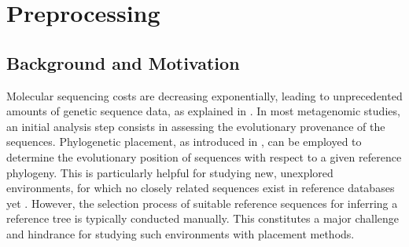 

\chapter{Preprocessing}
\label{ch:AutomaticTrees}






\section{Background and Motivation}
\label{ch:AutomaticTrees:sec:Motivation}

Molecular sequencing costs are decreasing exponentially, leading to unprecedented amounts of genetic sequence data,
as explained in .
In most metagenomic studies, an initial analysis step consists in assessing the evolutionary provenance of the sequences.
Phylogenetic placement, as introduced in ,
can be employed to determine the evolutionary position of sequences with respect to a given reference phylogeny.
This is particularly helpful for studying new, unexplored environments,
for which no closely related sequences exist in reference databases yet \cite{Mahe2017}.
However, the selection process of suitable reference sequences
for inferring a reference tree is typically conducted manually.
This constitutes a major challenge and hindrance for studying such environments with placement methods.

